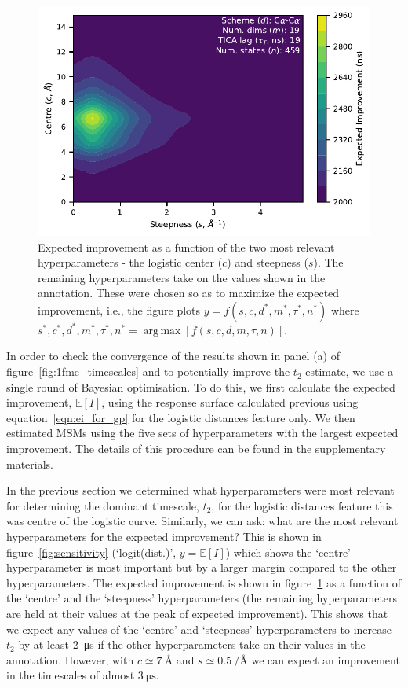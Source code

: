 \documentclass[journal=jacsat,manuscript=article]{achemso}
\DeclareMathOperator*{\argmax}{arg\,max}
\begin{document}
\begin{figure}
    \centering
    \includegraphics{figures/surface_distances_logistic_ei.pdf}
    \caption{Expected improvement as a function of the two most relevant hyperparameters - the logistic center ($c$) and steepness ($s$). The remaining hyperparameters take on the values shown in the annotation. These were chosen so as to maximize the expected improvement, i.e., the figure plots $y=f(s, c, d^{*}, m^{*}, \tau^{*}, n^{*})$ where $s^{*}, c^{*}, d^{*}, m^{*}, \tau^{*}, n^{*} = \argmax \left [f(s, c, d, m, \tau,n)\right]$. }
    \label{fig:ei_surface}
\end{figure}

In order to check the convergence of the results shown in panel (a) of figure~\ref{fig:1fme_timescales} and to potentially improve the $t_2$ estimate,  we use a single round of Bayesian optimisation. To do this, we first calculate the expected improvement, $\mathbb{E}[I]$,  using the response surface calculated previous using equation~\ref{eqn:ei_for_gp} for the logistic distances feature only. We then estimated MSMs using the five sets of hyperparameters with the largest expected improvement. The details of this procedure can be found in the supplementary materials. 

In the previous section we determined what hyperparameters were most relevant for determining the dominant timescale, $t_2$, for the logistic distances feature this was centre of the logistic curve. Similarly, we can ask: what are the most relevant hyperparameters for the expected improvement?  This is shown in figure~\ref{fig:sensitivity} (`logit(dist.)', $y=\mathbb{E}[I]$) which shows the `centre' hyperparameter is  most important but by a larger margin compared to the other hyperparameters.  The expected improvement is shown in figure~\ref{fig:ei_surface} as a function of the `centre' and the `steepness' hyperparameters (the remaining hyperparameters are held at their values at the peak of expected improvement).  This shows that we expect any values of the `centre' and `steepness' hyperparameters to increase $t_2$ by at least \SI{2}{\micro\second} if the other hyperparameters take on their values in the annotation. However, with $c\simeq \SI{7}{\angstrom}$ and $s\simeq \SI{0.5}{\per\angstrom}$ we can expect an improvement in the timescales of almost $\SI{3}{\micro\second}$. 
\end{document}
